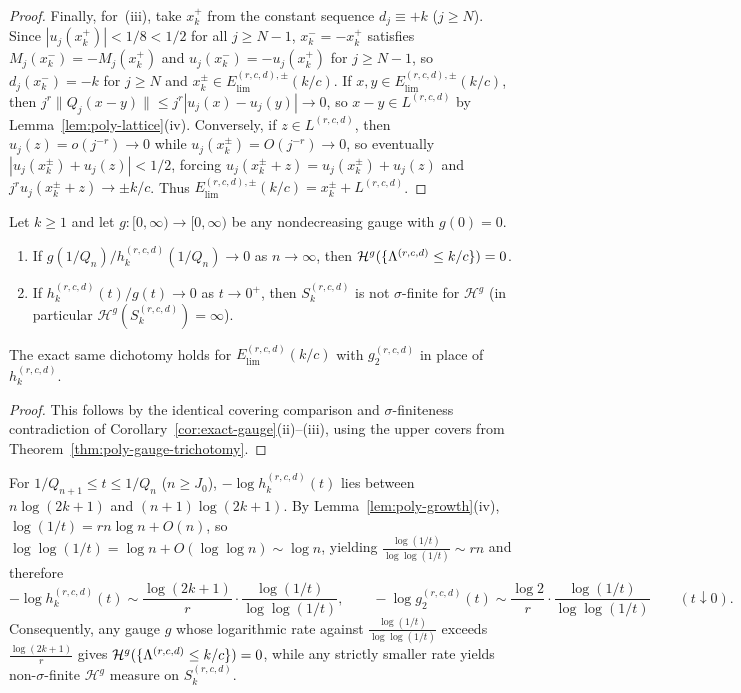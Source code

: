 \begin{proof}
Finally, for~(iii), take $x_k^+$ from the constant sequence $d_j\equiv+k$ ($j\ge N$).
Since $|u_j(x_k^+)|<1/8<1/2$ for all $j\ge N-1$, $x_k^-=-x_k^+$ satisfies
$M_j(x_k^-)=-M_j(x_k^+)$ and $u_j(x_k^-)=-u_j(x_k^+)$ for $j\ge N-1$, so
$d_j(x_k^-)=-k$ for $j\ge N$ and $x_k^\pm\in E_{\mathrm{lim}}^{(r,c,d),\pm}(k/c)$.
If $x,y\in E_{\mathrm{lim}}^{(r,c,d),\pm}(k/c)$, then
$j^r\|Q_j(x-y)\|\le j^r|u_j(x)-u_j(y)|\to0$, so $x-y\in L^{(r,c,d)}$ by
Lemma~\ref{lem:poly-lattice}(iv). Conversely, if $z\in L^{(r,c,d)}$, then
$u_j(z)=o(j^{-r})\to0$ while $u_j(x_k^\pm)=O(j^{-r})\to0$, so eventually
$|u_j(x_k^\pm)+u_j(z)|<1/2$, forcing $u_j(x_k^\pm+z)=u_j(x_k^\pm)+u_j(z)$ and
$j^ru_j(x_k^\pm+z)\to\pm k/c$. Thus $E_{\mathrm{lim}}^{(r,c,d),\pm}(k/c)=x_k^\pm+L^{(r,c,d)}$.
\end{proof}

\begin{corollary}\label{cor:poly-exact-gauge}
Let $k\ge1$ and let $g:[0,\infty)\to[0,\infty)$ be any nondecreasing gauge with $g(0)=0$.
\begin{enumerate}[label=(\roman*),leftmargin=2em]
\item If $g(1/Q_n)/h_k^{(r,c,d)}(1/Q_n)\to0$ as $n\to\infty$, then
$\mathcal H^g(\{\Lambda^{(r,c,d)}\le k/c\})=0$.
\item If $h_k^{(r,c,d)}(t)/g(t)\to0$ as $t\to0^+$, then $S_k^{(r,c,d)}$ is not
$\sigma$-finite for $\mathcal H^g$ (in particular $\mathcal H^g(S_k^{(r,c,d)})=\infty$).
\end{enumerate}
The exact same dichotomy holds for $E_{\mathrm{lim}}^{(r,c,d)}(k/c)$ with
$g_2^{(r,c,d)}$ in place of $h_k^{(r,c,d)}$.
\end{corollary}

\begin{proof}
This follows by the identical covering comparison and $\sigma$-finiteness
contradiction of Corollary~\ref{cor:exact-gauge}(ii)--(iii), using the upper
covers from Theorem~\ref{thm:poly-gauge-trichotomy}.
\end{proof}

\begin{remark}\label{rem:poly-gauge-scale}
For $1/Q_{n+1}\le t\le 1/Q_n$ ($n\ge J_0$), $-\log h_k^{(r,c,d)}(t)$ lies between
$n\log(2k+1)$ and $(n+1)\log(2k+1)$. By Lemma~\ref{lem:poly-growth}(iv),
$\log(1/t)=rn\log n+O(n)$, so $\log\log(1/t)=\log n+O(\log\log n)\sim\log n$,
yielding $\frac{\log(1/t)}{\log\log(1/t)}\sim rn$ and therefore
\[
-\log h_k^{(r,c,d)}(t)\sim\frac{\log(2k+1)}{r}\cdot\frac{\log(1/t)}{\log\log(1/t)},\qquad
-\log g_2^{(r,c,d)}(t)\sim\frac{\log2}{r}\cdot\frac{\log(1/t)}{\log\log(1/t)}
\qquad(t\downarrow0).
\]
Consequently, any gauge $g$ whose logarithmic rate against
$\frac{\log(1/t)}{\log\log(1/t)}$ exceeds $\frac{\log(2k+1)}{r}$ gives
$\mathcal H^g(\{\Lambda^{(r,c,d)}\le k/c\})=0$, while any strictly smaller rate
yields non-$\sigma$-finite $\mathcal H^g$ measure on $S_k^{(r,c,d)}$.
\end{remark}

